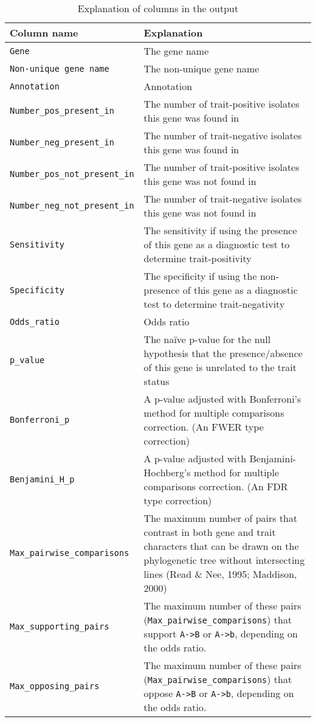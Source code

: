 \begin{longtable}{l|X}
  \caption{Explanation of columns in the output}\label{tab:cols} \\
  \toprule
  Column name & Explanation \\
  \midrule
  \endhead
  \verb+Gene+ & The gene name \\
  \verb+Non-unique gene name+ & The non-unique gene name \\
  \verb+Annotation+ & Annotation \\
  \verb+Number_pos_present_in+ & The number of trait-positive isolates this gene was found in \\
  \verb+Number_neg_present_in+ & The number of trait-negative isolates this gene was found in \\
  \verb+Number_pos_not_present_in+ & The number of trait-positive isolates this gene was not found in \\
  \verb+Number_neg_not_present_in+ & The number of trait-negative isolates this gene was not found in \\
  \verb+Sensitivity+ & The sensitivity if using the presence of this gene as a diagnostic test to determine trait-positivity \\
  \verb+Specificity+ & The specificity if using the non-presence of this gene as a diagnostic test to determine trait-negativity \\
  \verb+Odds_ratio+ & Odds ratio \\
  \verb+p_value+ & The naïve p-value for the null hypothesis that the presence/absence of this gene is unrelated to the trait status \\
  \verb+Bonferroni_p+ & A p-value adjusted with Bonferroni's method for multiple comparisons correction. (An FWER type correction) \\
  \verb+Benjamini_H_p+ & A p-value adjusted with Benjamini-Hochberg's method for multiple comparisons correction. (An FDR  type correction) \\
  \verb+Max_pairwise_comparisons+ & The maximum number of pairs that contrast in both gene and trait characters that can be drawn on the phylogenetic tree without intersecting lines (Read \& Nee, 1995; Maddison, 2000) \\
  \verb+Max_supporting_pairs+ & The maximum number of these pairs (\verb+Max_pairwise_comparisons+) that support \verb+A->B+ or \verb+A->b+, depending on the odds ratio. \\
  \verb+Max_opposing_pairs+ & The maximum number of these pairs (\verb+Max_pairwise_comparisons+) that oppose \verb+A->B+ or \verb+A->b+, depending on the odds ratio. \\

\end{longtable}
